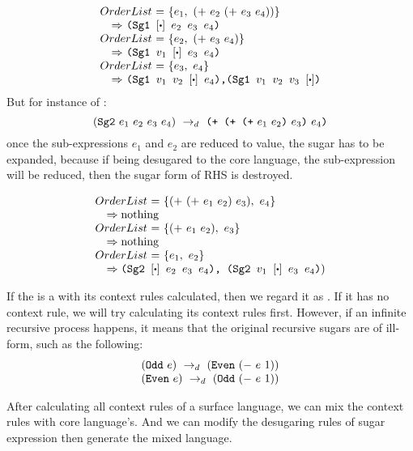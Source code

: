 \[
\begin{array}{l}
\mbox{$OrderList$ = $\{e_1,~(+~e_2~(+~e_3~e_4))\}$} \\
\quad \mbox{$\Rightarrow$ \Code{(Sg1 $[\bigcdot]~e_2~e_3~e_4$)}}\\
\mbox{$OrderList$ = $\{e_2,~(+~e_3~e_4)\}$}\\
\quad \mbox{$\Rightarrow$ \Code{(Sg1 $v_1~[\bigcdot]~e_3~e_4$)}}\\
\mbox{$OrderList$ = $\{e_3,~e_4\}$} \\
\quad \mbox{$\Rightarrow$ \Code{(Sg1 $v_1~v_2~[\bigcdot]~e_4$),(Sg1 $v_1~v_2~v_3~[\bigcdot]$)}}
\end{array}
\]
But for instance of :
\[
(\mbox{\tt Sg2}~e_1~e_2~e_3~e_4) ~\rightarrow_d~ \mbox{\tt (+~(+~(+}~e_1~e_2\mbox{\tt )}~e_3\mbox{\tt )}~e_4\mbox{\tt )}
\]
once the sub-expressions $e_1$ and $e_2$ are reduced to value, the sugar has to be expanded, because if being desugared to the core language, the sub-expression  will be reduced, then the sugar form of RHS is destroyed.



	\[
\begin{array}{l}
\mbox{$OrderList$ = $\{(+~(+~e_1~e_2)~e_3),~e_4\}$}\\
\quad \Rightarrow \mbox{nothing}\\
\mbox{$OrderList$ = $\{(+~e_1~e_2),~e_3\}$}\\
\quad \Rightarrow \mbox{nothing}\\
\mbox{$OrderList$ = $\{e_1,~e_2\}$}\\
\quad \Rightarrow \mbox{\Code{(Sg2 $[\bigcdot]~e_2~e_3~e_4$), (Sg2 $v_1~[\bigcdot]~e_3~e_4$)})}
\end{array}
\]


If the  is a  with its context rules calculated, then we regard it as . If it has no context rule, we will try calculating its context rules first. However, if an infinite recursive process happens, it means that the original recursive sugars are of ill-form, such as the following:
\[
\begin{array}{l}
(\mbox{\tt Odd}~e) ~\rightarrow_d~ (\mbox{\tt Even}~(-~e~1))\\
(\mbox{\tt Even}~e) ~\rightarrow_d~ (\mbox{\tt Odd}~(-~e~1))
\end{array}
\]

After calculating all context rules of a surface language, we can mix the context rules with core language's. And we can modify the desugaring rules of sugar expression then generate the mixed language.

